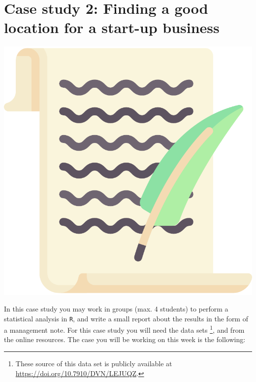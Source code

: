 
\begin{minipage}{0.8\textwidth}
\section{Case study 2: Finding a good location for a start-up business}
\end{minipage}%
\hfill%
\begin{minipage}{0.1\textwidth}
\includegraphics[width=\linewidth]{Files/Images/lettericon.pdf}
\end{minipage}
\vspace*{.1cm}

In this case study you may work in groups (max. 4 students) to perform a statistical analysis in \texttt{R}, and write a small report about the results in the form of a management note. For this case study you will need the data sets \footnote{These source of this data set is publicly available at \url{https://doi.org/10.7910/DVN/LEJUQZ}.},  and  from the online resources. The case you will be working on this week is the following: \\

